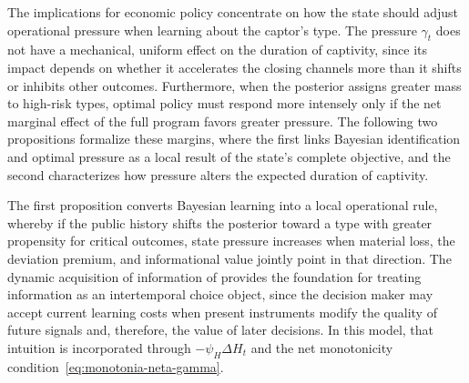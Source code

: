 \documentclass[pdflatex,sn-mathphys-ay]{sn-jnl}
\theoremstyle{plain}
\theoremstyle{definition}
\newcommand{\1}{\mathbf{1}}
\begin{document}
\noindent The implications for economic policy concentrate on how the state should adjust operational pressure when learning about the captor's type. The pressure $\gamma_t$ does not have a mechanical, uniform effect on the duration of captivity, since its impact depends on whether it accelerates the closing channels more than it shifts or inhibits other outcomes. Furthermore, when the posterior assigns greater mass to high-risk types, optimal policy must respond more intensely only if the net marginal effect of the full program favors greater pressure. The following two propositions formalize these margins, where the first links Bayesian identification and optimal pressure as a local result of the state's complete objective, and the second characterizes how pressure alters the expected duration of captivity.

\noindent The first proposition converts Bayesian learning into a local operational rule, whereby if the public history shifts the posterior toward a type with greater propensity for critical outcomes, state pressure increases when material loss, the deviation premium, and informational value jointly point in that direction. The dynamic acquisition of information of \citet{Zhong2022} provides the foundation for treating information as an intertemporal choice object, since the decision maker may accept current learning costs when present instruments modify the quality of future signals and, therefore, the value of later decisions. In this model, that intuition is incorporated through $-\psi_H\Delta H_t$ and the net monotonicity condition~\eqref{eq:monotonia-neta-gamma}.
\end{document}
